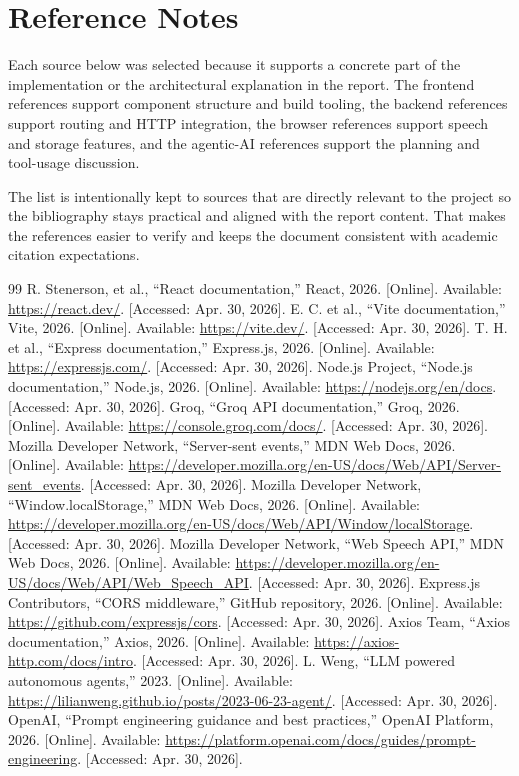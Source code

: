\documentclass[11pt,oneside]{report}
\begin{document}
\section{Reference Notes}
Each source below was selected because it supports a concrete part of the implementation or the architectural explanation in the report. The frontend references support component structure and build tooling, the backend references support routing and HTTP integration, the browser references support speech and storage features, and the agentic-AI references support the planning and tool-usage discussion.

The list is intentionally kept to sources that are directly relevant to the project so the bibliography stays practical and aligned with the report content. That makes the references easier to verify and keeps the document consistent with academic citation expectations.

{\small\justifying
\setlength{\parindent}{0pt}
\setlength{\parskip}{0pt}
\begin{thebibliography}{99}
 R. Stenerson, et al., ``React documentation,'' React, 2026. [Online]. Available: \url{https://react.dev/}. [Accessed: Apr. 30, 2026].
 E. C. et al., ``Vite documentation,'' Vite, 2026. [Online]. Available: \url{https://vite.dev/}. [Accessed: Apr. 30, 2026].
 T. H. et al., ``Express documentation,'' Express.js, 2026. [Online]. Available: \url{https://expressjs.com/}. [Accessed: Apr. 30, 2026].
 Node.js Project, ``Node.js documentation,'' Node.js, 2026. [Online]. Available: \url{https://nodejs.org/en/docs}. [Accessed: Apr. 30, 2026].
 Groq, ``Groq API documentation,'' Groq, 2026. [Online]. Available: \url{https://console.groq.com/docs/}. [Accessed: Apr. 30, 2026].
 Mozilla Developer Network, ``Server-sent events,'' MDN Web Docs, 2026. [Online]. Available: \url{https://developer.mozilla.org/en-US/docs/Web/API/Server-sent_events}. [Accessed: Apr. 30, 2026].
 Mozilla Developer Network, ``Window.localStorage,'' MDN Web Docs, 2026. [Online]. Available: \url{https://developer.mozilla.org/en-US/docs/Web/API/Window/localStorage}. [Accessed: Apr. 30, 2026].
 Mozilla Developer Network, ``Web Speech API,'' MDN Web Docs, 2026. [Online]. Available: \url{https://developer.mozilla.org/en-US/docs/Web/API/Web_Speech_API}. [Accessed: Apr. 30, 2026].
 Express.js Contributors, ``CORS middleware,'' GitHub repository, 2026. [Online]. Available: \url{https://github.com/expressjs/cors}. [Accessed: Apr. 30, 2026].
 Axios Team, ``Axios documentation,'' Axios, 2026. [Online]. Available: \url{https://axios-http.com/docs/intro}. [Accessed: Apr. 30, 2026].
 L. Weng, ``LLM powered autonomous agents,'' 2023. [Online]. Available: \url{https://lilianweng.github.io/posts/2023-06-23-agent/}. [Accessed: Apr. 30, 2026].
 OpenAI, ``Prompt engineering guidance and best practices,'' OpenAI Platform, 2026. [Online]. Available: \url{https://platform.openai.com/docs/guides/prompt-engineering}. [Accessed: Apr. 30, 2026].
\end{thebibliography}
}
\end{document}
